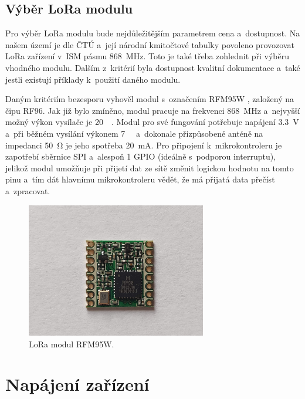 \subsection{Výběr LoRa modulu}

Pro výběr LoRa modulu bude nejdůležitějším parametrem cena a~dostupnost. Na našem území je dle ČTÚ a~její národní kmitočtové tabulky\cite{kmitoctovaTabulka} povoleno provozovat LoRa zařízení v~ISM pásmu \SI{868}{MHz}. Toto je také třeba zohlednit při výběru vhodného modulu. Dalším z~kritérií byla dostupnost kvalitní dokumentace a~také jestli existují příklady k~použití daného modulu.

\DeclareSIUnit {}   %
Daným kritériím bezesporu vyhověl modul s~označením RFM95W \cite{dat_RFM95W}, založený na čipu RF96. Jak již bylo zmíněno, modul pracuje na frekvenci \SI{868}{\mega\hertz} a~nejvyšší možný výkon vysílače je \SI{20}{\deci\belm}. Modul pro své fungování potřebuje napájení \SI{3,3}{\volt} a~při běžném vysílání výkonem \SI{+7}{\deci\belm} a~dokonale přizpůsobené anténě na impedanci \SI{50}{\ohm} je jeho spotřeba \SI{20}{\milli\ampere}. Pro připojení k~mikrokontroleru je zapotřebí sběrnice SPI a~alespoň 1 GPIO (ideálně s~podporou interruptu), jelikož modul umožňuje při přijetí dat ze sítě změnit logickou hodnotu na tomto pinu a~tím dát hlavnímu mikrokontroleru vědět, že má přijatá data přečíst a~zpracovat. 

\begin{figure}
    \centering
    \includegraphics[width=0.7\textwidth]{obrazky/rfm95w.jpg}
    \caption{LoRa modul RFM95W.}
    \label{fig_RFM95W}
\end{figure}

\section{Napájení zařízení}

